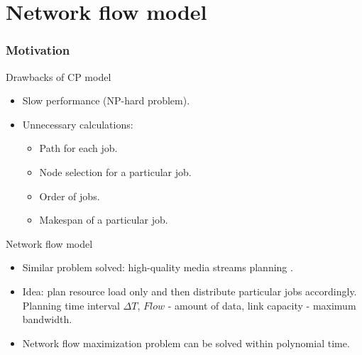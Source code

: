 \documentclass{beamer}
\begin{document}
\section{Network flow model}
\begin{frame}\frametitle{Motivation}
\begin{block}{Drawbacks of CP model}
\begin{itemize}
\item Slow performance (NP-hard problem).
\item Unnecessary calculations:
			\begin{itemize}
			\item Path for each job.
			\item Node selection for a particular job.
			\item Order  of jobs.
			\item Makespan of a particular job.
			\end{itemize}
\end{itemize}
\end{block}         

\begin{block}{Network flow model}
\begin{itemize}
\item Similar problem solved: high-quality media streams planning \cite{Rudova}.
\item Idea: plan resource load only and then distribute particular jobs accordingly. Planning time interval $\Delta T$, $Flow$ - amount of data, link capacity - maximum bandwidth.
\item Network flow maximization problem can be solved within polynomial time.
\end{itemize}
\end{block}    
\end{frame}
\end{document}
